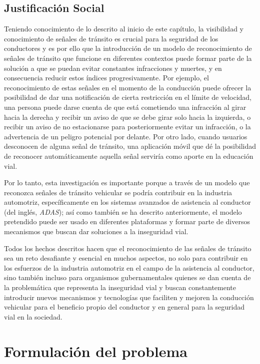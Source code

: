	\subsection{Justificación Social}
	
	Teniendo conocimiento de lo descrito al inicio de este capítulo, la visibilidad y conocimiento de señales de tránsito es crucial para la seguridad de los conductores y es por ello que la introducción de un modelo de reconocimiento de señales de tránsito que funcione en diferentes contextos puede formar parte de la solución a que se puedan evitar constantes infracciones y muertes, y en consecuencia reducir estos índices progresivamente. Por ejemplo, el reconocimiento de estas señales en el momento de la conducción puede ofrecer la posibilidad de dar una notificación de cierta restricción en el límite de velocidad, una persona puede darse cuenta de que está cometiendo una infracción al girar hacia la derecha y recibir un aviso de que se debe girar solo hacia la izquierda, o recibir un aviso de no estacionarse para posteriormente evitar un infracción, o la advertencia de un peligro potencial por delante. Por otro lado, cuando usuarios desconocen de alguna señal de tránsito, una aplicación móvil que dé la posibilidad de reconocer automáticamente aquella señal serviría como aporte en la educación vial.\vskip 0.2cm

	Por lo tanto, esta investigación es importante porque a través de un modelo que reconozca señales de tránsito vehicular se podría contribuir en la industria automotriz, específicamente en los sistemas avanzados de asistencia al conductor (del inglés, \textit{ADAS}); así como también se ha descrito anteriormente, el modelo pretendido puede ser usado en diferentes plataformas y formar parte de diversos mecanismos que buscan dar soluciones a la inseguridad vial. \vskip 0.2cm
	
	Todos los hechos descritos hacen que el reconocimiento de las señales de tránsito sea un reto desafiante y esencial en muchos aspectos, no solo para contribuir en los esfuerzos de la industria automotriz en el campo de la asistencia al conductor, sino también incluso para organismos gubernamentales quienes se dan cuenta de la problemática que representa la inseguridad vial y buscan constantemente introducir nuevos mecanismos y tecnologías que faciliten y mejoren la conducción vehicular para el beneficio propio del conductor y en general para la seguridad vial en la sociedad.


\section{Formulación del problema}

